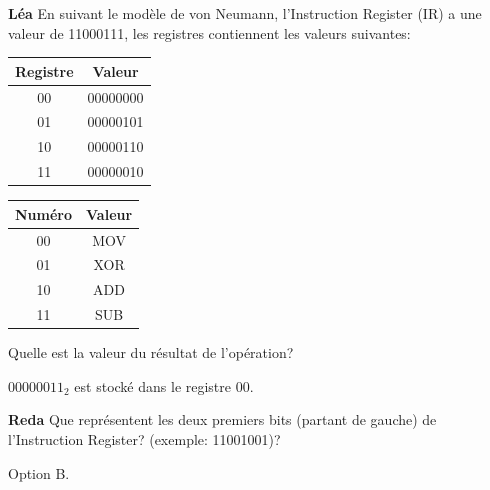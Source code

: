 \begin{Exercice}[10 minutes]\textbf{Léa}
En suivant le modèle de von Neumann, l'Instruction Register (IR) a une valeur de 11000111, les registres contiennent les valeurs suivantes:
\begin{table}[h!]
\centering
\begin{tabular}{|c|c|}
\hline
\textbf{Registre} & \textbf{Valeur} \\ \hline
00 & 00000000 \\  \hline
01 & 00000101 \\  \hline
10 & 00000110 \\  \hline
11 & 00000010 \\ \hline
\end{tabular}
\end{table}

\begin{center}
\begin{tabular}{|c|c|}
\hline
\textbf{Numéro} & \textbf{Valeur} \\ \hline
00 & MOV \\  \hline
01 & XOR \\  \hline
10 & ADD \\  \hline
11 & SUB \\ \hline
\end{tabular}
\end{center}
Quelle est la valeur du résultat de l'opération?
\begin{solution}
$00000011_2$ est stocké dans le registre 00.
\end{solution}
\end{Exercice}


\begin{Exercice}[10 minutes]\textbf{Reda}
Que représentent les deux premiers bits (partant de gauche) de l'Instruction Register? (exemple: 11001001)?

\begin{solution}
Option B.
\end{solution}
\end{Exercice}

